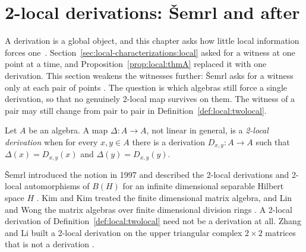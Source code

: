 \section{2-local derivations: \v{S}emrl and after}\label{sec:local-characterizations:two-local}

A derivation is a global object, and this chapter asks how little local
information forces one~\cite[p.~15]{AyupovKudaybergenov2012}. Section~\ref{sec:local-characterizations:local} asked for a witness at one
point at a time, and Proposition~\ref{prop:local:thmA} replaced it with one
derivation. This section weakens the witnesses further: \v{S}emrl asks for a
witness only at each pair of points
\cite[p.~15]{AyupovKudaybergenov2012}. The question is which algebras still
force a single derivation, so that no genuinely 2-local map survives on them.
The witness of a pair may still
change from pair to pair in Definition~\ref{def:local:twolocal}.

\begin{definition}\label{def:local:twolocal}
Let $A$ be an algebra. A map $\Delta\colon A\to A$, not linear in general,
is a \emph{2-local derivation} when for every $x,y\in A$ there is a
derivation $D_{x,y}\colon A\to A$ such that $\Delta(x)=D_{x,y}(x)$ and
$\Delta(y)=D_{x,y}(y)$.
\end{definition}

\v{S}emrl introduced the notion in 1997 and described the 2-local
derivations and 2-local automorphisms of $B(H)$ for an infinite dimensional
separable Hilbert space $H$ \cite[Abstract, p.~2677]{Semrl1997TwoLocal}. Kim and
Kim treated the finite dimensional matrix algebra, and Lin and Wong the
matrix algebras over finite dimensional division rings
\cite[p.~15]{AyupovKudaybergenov2012}. A 2-local derivation of
Definition~\ref{def:local:twolocal} need not be a derivation at all. Zhang
and Li built a 2-local derivation on the upper triangular
complex $2\times 2$ matrices that is not a derivation
\cite[p.~15]{AyupovKudaybergenov2012}.

